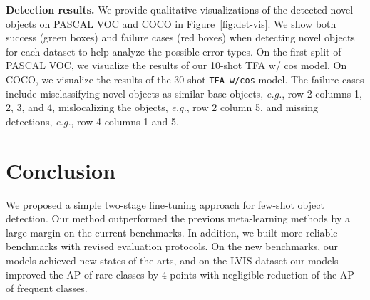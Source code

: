 \documentclass{article}
\newcommand{\model}{TFA\xspace}
\newcommand\minisection[1]{\vspace{1mm}\noindent \textbf{#1}}
\begin{document}
\begin{table}[!h]
	\centering
	\footnotesize
	\setlength{\tabcolsep}{0.4em}
	\caption{Ablation of scaling factor of cosine similarity. \vspace{1mm}}
	\label{tab:cos_scale}
\end{table}

\minisection{Detection results.}
We provide qualitative visualizations of the detected novel objects on PASCAL VOC and COCO in Figure~\ref{fig:det-vis}.
We show both success (green boxes) and failure cases (red boxes) when detecting novel objects for each dataset to help analyze the possible error types.
On the first split of PASCAL VOC, we visualize the results of our 10-shot \model w/ cos model.
On COCO, we visualize the results of the 30-shot \texttt{\model w/cos} model.
The failure cases include misclassifying novel objects as similar base objects, \textit{e.g.}, row 2 columns 1, 2, 3, and 4, mislocalizing the objects, \textit{e.g.}, row 2 column 5, and missing detections, \textit{e.g.}, row 4 columns 1 and 5.




 \section{Conclusion}
We proposed a simple two-stage fine-tuning approach for few-shot object detection.
Our method outperformed the previous meta-learning methods by a large margin on the current benchmarks.
In addition, we built more reliable benchmarks with revised evaluation protocols.
On the new benchmarks, our models achieved new states of the arts, and on the LVIS dataset our models improved the AP of rare classes by 4 points with negligible reduction of the AP of frequent classes.
\end{document}
